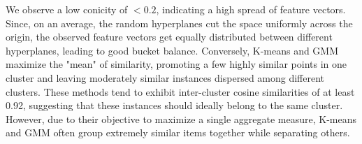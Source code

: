 \documentclass[letterpaper]{article}
\begin{document}
We observe a low conicity of $<0.2$, indicating a high spread of feature vectors. Since, on an average, the random hyperplanes cut the space uniformly across the origin, the observed feature vectors get equally distributed between 
different hyperplanes, leading to good bucket balance.
Conversely, K-means and GMM maximize the "mean" of similarity, promoting a few highly similar points in one cluster and leaving moderately similar instances dispersed among different clusters. These methods tend to exhibit inter-cluster cosine similarities of at least 0.92, suggesting that these instances should ideally belong to the same cluster. However, due to their objective to maximize a single aggregate measure, K-means and GMM often group extremely similar items together while separating others.









 


\end{document}
